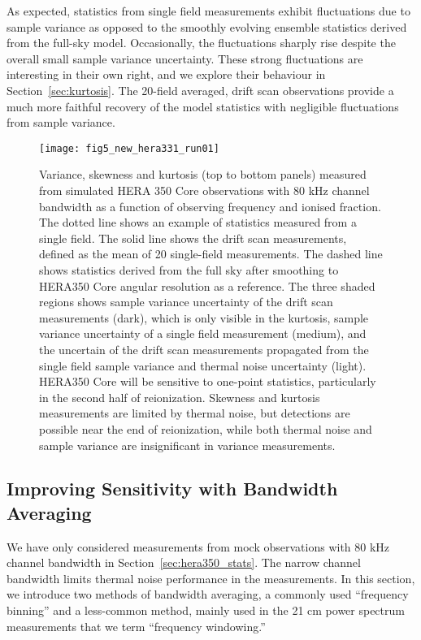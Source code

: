 \documentclass[fleqn,usenatbib]{mnras}
\begin{document}
As expected, statistics from single field measurements exhibit fluctuations due to sample variance as opposed to the smoothly evolving ensemble statistics derived from the full-sky model. Occasionally, the fluctuations sharply rise despite the overall small sample variance uncertainty. These strong fluctuations are interesting in their own right, and we explore their behaviour in Section~\ref{sec:kurtosis}. The 20-field averaged, drift scan observations provide a much more faithful recovery of the model statistics with negligible fluctuations from sample variance.


\begin{figure}
    \texttt{[image: fig5\_new\_hera331\_run01]}
    \caption{Variance, skewness and kurtosis (top to bottom panels) measured from simulated HERA 350 Core observations with 80 kHz channel bandwidth as a function of observing frequency and ionised fraction. The dotted line shows an example of statistics measured from a single field. The solid line shows the drift scan measurements, defined as the mean of 20 single-field measurements. The dashed line shows statistics derived from the full sky after smoothing to HERA350 Core angular resolution as a reference. The three shaded regions shows sample variance uncertainty of the drift scan measurements (dark), which is only visible in the kurtosis, sample variance uncertainty of a single field measurement (medium), and the uncertain of the drift scan measurements propagated from the single field sample variance and thermal noise uncertainty (light). HERA350 Core will be sensitive to one-point statistics, particularly in the second half of reionization. Skewness and kurtosis measurements are limited by thermal noise, but detections are possible near the end of reionization, while both thermal noise and sample variance are insignificant in variance measurements.}
    \label{fig:stats_hera350}
\end{figure}

\subsection{Improving Sensitivity with Bandwidth Averaging}
\label{sec:bandwidth}
We have only considered measurements from mock observations with 80 kHz channel bandwidth in Section~\ref{sec:hera350_stats}. The narrow channel bandwidth limits thermal noise performance in the measurements.  In this section, we introduce two methods of bandwidth averaging, a commonly used ``frequency binning'' and a less-common method, mainly used in the 21 cm power spectrum measurements that we term ``frequency windowing.''
\end{document}

